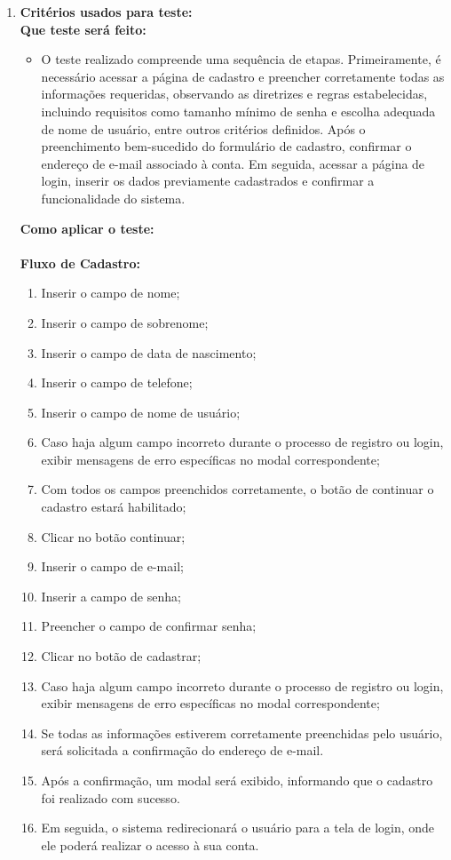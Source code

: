 \begin{enumerate}
\item{\textbf{Critérios usados para teste:}}
\\
\textbf{Que teste será feito:} 
\begin{itemize}
\item O teste realizado compreende uma sequência de etapas. Primeiramente, é necessário acessar a página de cadastro e preencher corretamente todas as informações requeridas, observando as diretrizes e regras estabelecidas, incluindo requisitos como tamanho mínimo de senha e escolha adequada de nome de usuário, entre outros critérios definidos. Após o preenchimento bem-sucedido do formulário de cadastro, confirmar o endereço de e-mail associado à conta. Em seguida, acessar a página de login, inserir os dados previamente cadastrados e confirmar a funcionalidade do sistema. 
\end{itemize}

\textbf{Como aplicar o teste:} 
\\
\\\textbf{Fluxo de Cadastro:}
\begin{enumerate}
\item Inserir o campo de nome;
\item Inserir o campo de sobrenome;
\item Inserir o campo de data de nascimento;
\item Inserir o campo de telefone;
\item Inserir o campo de nome de usuário;
\item Caso haja algum campo incorreto durante o processo de registro ou login, exibir mensagens de erro específicas no modal correspondente;
\item Com todos os campos preenchidos corretamente, o botão de continuar o cadastro estará habilitado;
\item Clicar no botão continuar;
\item Inserir o campo de e-mail;
\item Inserir a campo de senha;
\item Preencher o campo de confirmar senha;
\item Clicar no botão de cadastrar;
\item Caso haja algum campo incorreto durante o processo de registro ou login, exibir mensagens de erro específicas no modal correspondente;
\item Se todas as informações estiverem corretamente preenchidas pelo usuário, será solicitada a confirmação do endereço de e-mail.
\item Após a confirmação, um modal será exibido, informando que o cadastro foi realizado com sucesso.
\item Em seguida, o sistema redirecionará o usuário para a tela de login, onde ele poderá realizar o acesso à sua conta.
\end{enumerate}


\end{enumerate}
